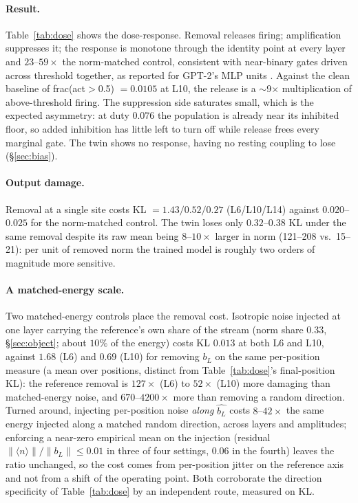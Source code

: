 \documentclass[11pt]{article}
\newcommand{\bl}{b_L}
\begin{document}
\paragraph{Result.} Table~\ref{tab:dose} shows the dose-response.
Removal releases firing;
amplification suppresses it; the response is monotone through the
identity point at every layer and $23$--$59\times$ the norm-matched
control, consistent with near-binary gates driven across threshold
together, as reported for GPT-2's MLP units \citep{balogh2026}. Against the clean
baseline of frac(act$>$0.5) $= 0.0105$ at L10, the release is a
$\sim$9$\times$ multiplication of above-threshold firing. The
suppression side saturates small, which is the expected asymmetry: at
duty 0.076 the population is already near its inhibited floor, so
added inhibition has little left to turn off while release frees every
marginal gate. The twin shows no response, having no resting coupling
to lose (\S\ref{sec:bias}).

\paragraph{Output damage.} Removal at a single site costs
KL $= 1.43 / 0.52 / 0.27$ (L6/L10/L14) against $0.020$--$0.025$ for
the norm-matched control. The twin loses only $0.32$--$0.38$ KL under
the same removal despite its raw mean being $8$--$10\times$ larger in norm (121--208 vs.\ 15--21): per unit of removed norm the trained model is
roughly two orders of magnitude more sensitive.

\paragraph{A matched-energy scale.} Two matched-energy controls place
the removal cost. Isotropic noise injected at one layer carrying
the reference's own share of the stream (norm share $0.33$,
\S\ref{sec:object}; about $10\%$ of the energy) costs
KL $0.013$ at both L6 and L10, against $1.68$ (L6) and $0.69$ (L10) for
removing $\bl$ on the same per-position measure (a mean over positions,
distinct from Table~\ref{tab:dose}'s final-position KL): the reference
removal is $127\times$ (L6) to $52\times$ (L10) more damaging than
matched-energy noise, and $670$--$4200\times$ more than removing a random
direction. Turned around, injecting per-position noise \emph{along}
$\hat{\bl}$ costs $8$--$42\times$ the same energy injected along a
matched random direction, across layers and amplitudes; enforcing a
near-zero empirical mean on the injection (residual
$\|\langle n\rangle\|/\|\bl\| \leq 0.01$ in three of four settings,
$0.06$ in the fourth) leaves the ratio unchanged, so the cost comes from
per-position jitter on the reference axis and not from a shift of the
operating point. Both corroborate the direction specificity of
Table~\ref{tab:dose} by an independent route, measured on KL.
\end{document}
